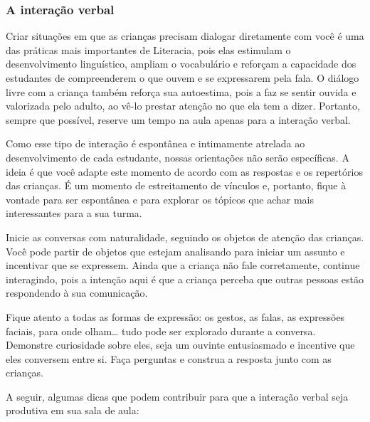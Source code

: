 \documentclass[11pt]{extarticle}
\begin{document}
\subsubsection{A interação verbal} 
Criar situações em que as crianças precisam dialogar diretamente com 
você é uma das práticas mais importantes de Literacia, pois elas estimulam 
o desenvolvimento linguístico, ampliam o vocabulário e reforçam a 
capacidade dos estudantes de compreenderem o que ouvem e se expressarem 
pela fala. O diálogo livre com a criança também reforça sua autoestima, pois 
a faz se sentir ouvida e valorizada pelo adulto, ao vê-lo prestar atenção 
no que ela tem a dizer. Portanto, sempre que possível, reserve um tempo na 
aula apenas para a interação verbal. 


Como esse tipo de interação é espontânea e intimamente atrelada ao 
desenvolvimento de cada estudante, nossas orientações não serão específicas. 
A ideia é que você adapte este momento de acordo com as respostas e os 
repertórios das crianças. É um momento de estreitamento de vínculos e, portanto, 
fique à vontade para ser espontânea e para explorar os tópicos que achar 
mais interessantes para a sua turma.

Inicie as conversas com naturalidade, seguindo os objetos de atenção das crianças. 
Você pode partir de objetos que estejam analisando
para iniciar um assunto e incentivar que se expressem. Ainda que a
criança não fale corretamente, continue interagindo, 
pois a intenção aqui é que a criança perceba que outras pessoas estão respondendo 
à sua comunicação. 

Fique atento a todas as formas de expressão: os gestos, as falas, as 
expressões faciais, para onde olham\ldots{} tudo pode ser explorado durante a conversa. 
Demonstre curiosidade sobre eles, seja um ouvinte entusiasmado e incentive que eles 
conversem entre si. Faça perguntas e construa a resposta junto com as crianças. 

A seguir, algumas dicas que podem contribuir para que a interação verbal 
seja produtiva em sua sala de aula: 
\end{document}
